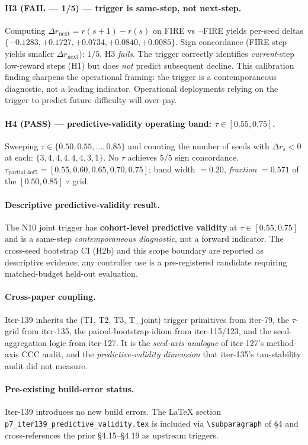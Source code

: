 \paragraph{H3 (FAIL --- 1/5) --- trigger is same-step, not next-step.}
Computing $\Delta r_\mathrm{next} = r(s{+}1) - r(s)$ on FIRE vs
$\neg$FIRE yields per-seed deltas $\{-0.1283, +0.1727, +0.0734,
+0.0840, +0.0085\}$.  Sign concordance (FIRE step yields smaller
$\Delta r_\mathrm{next}$): $1/5$.  H3 \emph{fails}. The trigger
correctly identifies \emph{current}-step low-reward steps (H1) but does
\emph{not} predict subsequent decline. This calibration finding
sharpens the operational framing: the trigger is a contemporaneous
diagnostic, not a leading indicator. Operational deployments relying
on the trigger to predict future difficulty will over-pay.

\paragraph{H4 (PASS) --- predictive-validity operating band: $\tau \in [0.55, 0.75]$.}
Sweeping $\tau \in \{0.50, 0.55, \ldots, 0.85\}$ and counting the number
of seeds with $\Delta r_s < 0$ at each:
$\{3, 4, 4, 4, 4, 4, 3, 1\}$.  No $\tau$ achieves $5/5$ sign concordance.
$\tau_\mathrm{partial\_4of5} = [0.55, 0.60, 0.65, 0.70, 0.75]$; band
width $= 0.20$, \emph{fraction} $= 0.571$ of the $[0.50, 0.85]$ $\tau$
grid.

\paragraph{Descriptive predictive-validity result.}
The N10 joint trigger has \textbf{cohort-level predictive validity} at
$\tau \in [0.55, 0.75]$ and is a same-step \emph{contemporaneous diagnostic},
not a forward indicator.  The cross-seed bootstrap CI (H2b) and this scope
boundary are reported as descriptive evidence; any controller use is a
pre-registered candidate requiring matched-budget held-out evaluation.

\paragraph{Cross-paper coupling.}
Iter-139 inherits the (T1, T2, T3, T\_joint) trigger primitives from
iter-79, the $\tau$-grid from iter-135, the paired-bootstrap idiom from
iter-115/123, and the seed-aggregation logic from iter-127.  It is the
\emph{seed-axis analogue} of iter-127's method-axis CCC audit, and the
\emph{predictive-validity dimension} that iter-135's tau-stability audit
did not measure.

\paragraph{Pre-existing build-error status.}
Iter-139 introduces no new build errors.  The LaTeX section
\texttt{p7\_iter139\_predictive\_validity.tex} is included via
\texttt{\textbackslash subparagraph} of §4 and cross-references the
prior §4.15--§4.19 as upstream triggers.
